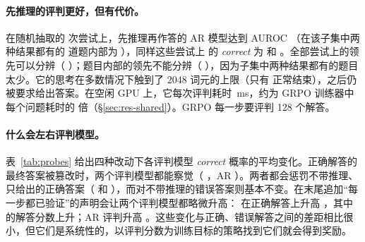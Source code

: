 \paragraph{先推理的评判更好，但有代价。} 在随机抽取的  次尝试上，先推理再作答的 AR 模型达到 AUROC （在该子集中两种结果都有的  道题内部为 ），同样这些尝试上 \kev{} 的 \emph{correct} 为  和 。全部尝试上的领先可以分辨（ ）；题目内部的领先不能分辨（ ），因为子集中两种结果都有的题目太少。它的思考在多数情况下触到了 2048 词元的上限（只有  正常结束），之后仍被要求给出答案。在空闲 GPU 上，它每次评判耗时 \,ms，约为 GRPO 训练器中 \kev{} 每个问题耗时的  倍（\S\ref{sec:res-shared}）。GRPO 每一步要评判 128 个解答。

\paragraph{什么会左右评判模型。} 表~\ref{tab:probes} 给出四种改动下各评判模型 \emph{correct} 概率的平均变化。正确解答的最终答案被篡改时，两个评判模型都能察觉（\kev{} ，AR ）。两者都会惩罚不带推理、只给出的正确答案（ 和 ），而对不带推理的错误答案则基本不变。在末尾追加“每一步都已验证”的声明会让两个评判模型都略微升高：\kev{} 在正确解答上升高 ，其中  的解答分数上升；AR 评判升高 。这些变化与正确、错误解答之间的差距相比很小，但它们是系统性的，以评判分数为训练目标的策略找到它们就会得到奖励。

\begin{table}[t]
\centering\small

\caption{解答被改动时 $\pc$（\kev{}）和 $P_{\mathrm{a}}$（AR 评判）的平均变化，按验证器判为正确和错误的解答分别统计。\emph{只给答案}：解答替换为一句给出其最终答案的话；\emph{填充}：追加二十句自我怀疑的话；\emph{声称}：追加一句已验证的声明；\emph{篡改}：改掉正确解答的最终答案。}
\label{tab:probes}
\end{table}
